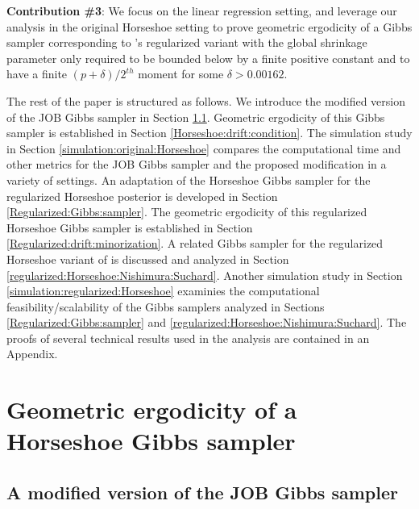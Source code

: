 \documentclass[noinfoline,11pt]{imsart}
\numberwithin{equation}{section}
\theoremstyle{plain}
\begin{document}
{\bf Contribution \#3}: We focus on the linear regression setting, and leverage our analysis in the original Horseshoe setting to prove geometric ergodicity of a Gibbs sampler corresponding to \cite{nishimura2019shrinkage}'s regularized variant with the global shrinkage parameter only required to be bounded below by a finite positive constant and to have a finite $(p+\delta)/2^{th}$ moment for some $\delta > 0.00162$. 

The rest of the paper is structured as follows. We introduce the modified version of the JOB Gibbs sampler in Section \ref{Horseshoe:Gibbs:sampler}. Geometric ergodicity of this Gibbs sampler is established in Section \ref{Horseshoe:drift:condition}. The simulation study in Section \ref{simulation:original:Horseshoe} compares the computational time and other metrics for the JOB Gibbs sampler and the proposed modification in a variety of settings. An adaptation of the Horseshoe Gibbs sampler for the regularized Horseshoe posterior is developed in Section \ref{Regularized:Gibbs:sampler}. The geometric 
ergodicity of this regularized Horseshoe Gibbs sampler is established in 
Section \ref{Regularized:drift:minorization}. A related Gibbs sampler for the regularized Horseshoe variant of \cite{nishimura2019shrinkage} is discussed and analyzed in Section \ref{regularized:Horseshoe:Nishimura:Suchard}. Another simulation study in Section \ref{simulation:regularized:Horseshoe} examinies the computational feasibility/scalability of the Gibbs samplers analyzed in 
Sections \ref{Regularized:Gibbs:sampler} and 
\ref{regularized:Horseshoe:Nishimura:Suchard}. The proofs of several 
technical results used in the analysis are contained in an Appendix. 



\section{Geometric ergodicity of a Horseshoe Gibbs sampler}\label{original:horseshoe}

\subsection{A modified version of the JOB Gibbs sampler} 
\label{Horseshoe:Gibbs:sampler}
\end{document}
